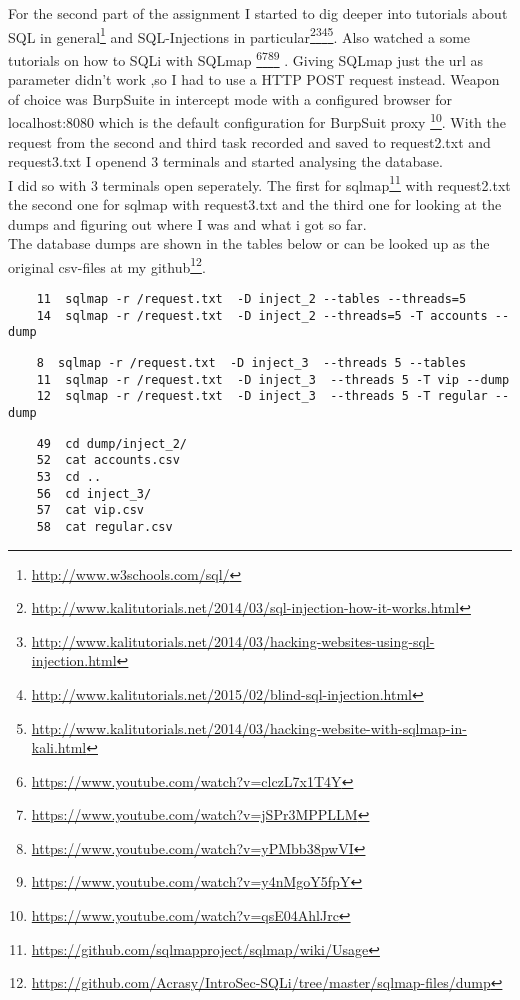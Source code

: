 \documentclass{scrartcl}
\begin{document}
	For the second part of the assignment I started to dig deeper into tutorials about SQL in general\footnote{\url{http://www.w3schools.com/sql/}} and  SQL-Injections in particular\footnote{\url{http://www.kalitutorials.net/2014/03/sql-injection-how-it-works.html}}\footnote{\url{http://www.kalitutorials.net/2014/03/hacking-websites-using-sql-injection.html}}\footnote{\url{http://www.kalitutorials.net/2015/02/blind-sql-injection.html}}\footnote{\url{http://www.kalitutorials.net/2014/03/hacking-website-with-sqlmap-in-kali.html}}. Also watched a some tutorials on how to SQLi with SQLmap \footnote{\url{https://www.youtube.com/watch?v=clczL7x1T4Y}}\footnote{\url{https://www.youtube.com/watch?v=jSPr3MPPLLM}}\footnote{\url{https://www.youtube.com/watch?v=yPMbb38pwVI}}\footnote{\url{https://www.youtube.com/watch?v=y4nMgoY5fpY}} .
	Giving SQLmap just the url as parameter didn't work ,so I had to use a HTTP POST request instead. Weapon of choice was BurpSuite in intercept mode with a configured browser for localhost:8080 which is the default configuration for BurpSuit proxy \footnote{\url{https://www.youtube.com/watch?v=qsE04AhlJrc}}.
	With the request from the second and third task recorded and saved to request2.txt and request3.txt I openend 3 terminals and started analysing the database. \\
	I did so with 3 terminals open seperately. The first for sqlmap\footnote{\url{https://github.com/sqlmapproject/sqlmap/wiki/Usage}} with request2.txt the second one for sqlmap with request3.txt and the third one for looking at the dumps and figuring out where I was and what i got so far.\\
	The database dumps are shown in the tables below or can be looked up as the original csv-files at my github\footnote{\url{https://github.com/Acrasy/IntroSec-SQLi/tree/master/sqlmap-files/dump}}.
	
	\begin{lstlisting}
	11  sqlmap -r /request.txt  -D inject_2 --tables --threads=5
	14  sqlmap -r /request.txt  -D inject_2 --threads=5 -T accounts --dump
	\end{lstlisting}
	
	\begin{lstlisting}
	8  sqlmap -r /request.txt  -D inject_3  --threads 5 --tables
	11  sqlmap -r /request.txt  -D inject_3  --threads 5 -T vip --dump
	12  sqlmap -r /request.txt  -D inject_3  --threads 5 -T regular --dump
	\end{lstlisting}
	
	\begin{lstlisting}
	49  cd dump/inject_2/
	52  cat accounts.csv 
	53  cd ..
	56  cd inject_3/
	57  cat vip.csv
	58  cat regular.csv 
	\end{lstlisting}
	
\end{document}
